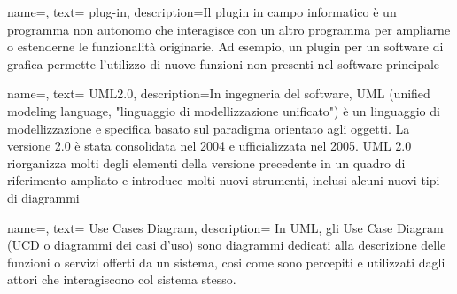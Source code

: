 {
    name=,
    text= plug-in,
    description={Il plugin in campo informatico è un programma non autonomo che interagisce con un altro programma per ampliarne o estenderne le funzionalità originarie. Ad esempio, un plugin per un software di grafica permette l'utilizzo di nuove funzioni non presenti nel software principale}
}


{
    name=,
    text= UML2.0,
    description={In ingegneria del software, UML (unified modeling language, "linguaggio di modellizzazione unificato") è un linguaggio di modellizzazione e specifica basato
sul paradigma orientato agli oggetti. La versione 2.0 è stata consolidata nel 2004 e ufficializzata nel 2005. UML 2.0 riorganizza molti degli elementi della versione precedente in un quadro di riferimento ampliato e introduce molti nuovi strumenti, inclusi alcuni nuovi tipi di diagrammi }
}



{
    name=,
    text= Use Cases Diagram,
    description={ In UML, gli Use Case Diagram (UCD o diagrammi dei casi d'uso) sono diagrammi dedicati alla descrizione delle funzioni o servizi offerti da un sistema, cosi come sono percepiti e utilizzati dagli attori che interagiscono col sistema stesso.}
}











